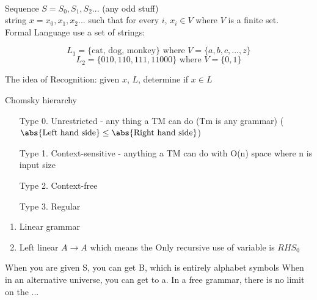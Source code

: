 
\\
    Sequence $S = S_0, S_1, S_2 ...$ (any odd stuff)\\
    string $x = x_0, x_1, x_2 ...$ such that for every $i$, $x_i \in V$ where $V$ is a finite set.\\
    Formal Language use a set of strings:
    \begin{exmp}
    \[L_1 = \{\text{cat, dog, monkey}\} \text{ where }  V = \{a,b,c,...,z\}\]
    \[L_2 = \{010,110,111,11000\} \text{ where } V = \{0,1\}\]
    \end{exmp}


The idea of Recognition: given $x$, $L$, determine if $x \in L$

\begin{thm}
Chomsky hierarchy
    \begin{enumerate}
        \item[Type 0.] Unrestricted - any thing a TM can do (Tm is any grammar) ($\abs{\text{Left hand side}} \leq \abs{\text{Right hand side}}$) 
        \item[Type 1.] Context-sensitive - anything a TM can do with O(n) space where n is input size
        \item[Type 2.] Context-free
        \item[Type 3.] Regular 
    \end{enumerate}
\end{thm}

\begin{defn} \leavevmode

    \begin{enumerate}
        \item Linear grammar
        \item Left linear
        $A \to A$ which means the Only recursive use of variable is $RHS_0$
    \end{enumerate}
\end{defn}


\begin{thm}When you are given S, you can get B, which is entirely alphabet symbols
    When in an alternative universe, you can get to a. 
    In a free grammar, there is no limit on the  ...
\end{thm}


